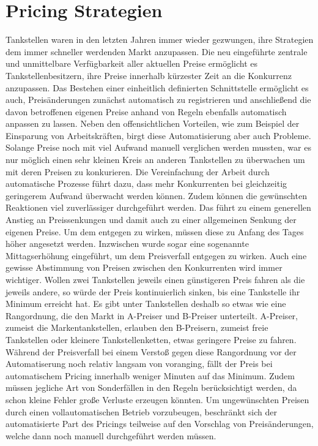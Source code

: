 \section{Pricing Strategien}
Tankstellen waren in den letzten Jahren immer wieder gezwungen, ihre Strategien dem immer schneller werdenden Markt anzupassen. Die neu eingeführte zentrale und unmittelbare Verfügbarkeit aller aktuellen Preise ermöglicht es Tankstellenbesitzern, ihre Preise innerhalb kürzester Zeit an die Konkurrenz anzupassen. Das Bestehen einer einheitlich definierten Schnittstelle ermöglicht es auch, Preisänderungen zunächst automatisch zu registrieren und anschließend die davon betroffenen eigenen Preise anhand von Regeln ebenfalls automatisch anpassen zu lassen. Neben den offensichtlichen Vorteilen, wie zum Beispiel der Einsparung von Arbeitskräften, birgt diese Automatisierung aber auch Probleme.\\
Solange Preise noch mit viel Aufwand manuell verglichen werden mussten, war es nur möglich einen sehr kleinen Kreis an anderen Tankstellen zu überwachen um mit deren Preisen zu konkurieren. Die Vereinfachung der Arbeit durch automatische Prozesse führt dazu, dass mehr Konkurrenten bei gleichzeitig geringerem Aufwand überwacht werden können. Zudem können die gewünschten Reaktionen viel zuverlässiger durchgeführt werden. Das führt zu einem generellen Anstieg an Preissenkungen und damit auch zu einer allgemeinen Senkung der eigenen Preise. Um dem entgegen zu wirken, müssen diese zu Anfang des Tages höher angesetzt werden. Inzwischen wurde sogar eine sogenannte Mittagserhöhung eingeführt, um dem Preisverfall entgegen zu wirken. Auch eine gewisse Abstimmung von Preisen zwischen den Konkurrenten wird immer wichtiger. Wollen zwei Tankstellen jeweils einen günstigeren Preis fahren als die jeweils andere, so würde der Preis kontinuierlich sinken, bis eine Tankstelle ihr Minimum erreicht hat. Es gibt unter Tankstellen deshalb so etwas wie eine Rangordnung, die den Markt in A-Preiser und B-Preiser unterteilt. A-Preiser, zumeist die Markentankstellen, erlauben den B-Preisern, zumeist freie Tankstellen oder kleinere Tankstellenketten, etwas geringere Preise zu fahren. Während der Preisverfall bei einem Verstoß gegen diese Rangordnung vor der Automatiserung noch relativ langsam von voranging, fällt der Preis bei automatischem Pricing innerhalb weniger Minuten auf das Minimum. Zudem müssen jegliche Art von Sonderfällen in den Regeln berücksichtigt werden, da schon kleine Fehler große Verluste erzeugen könnten. Um ungewünschten Preisen durch einen vollautomatischen Betrieb vorzubeugen, beschränkt sich der automatisierte Part des Pricings teilweise auf den Vorschlag von Preisänderungen, welche dann noch manuell durchgeführt werden müssen.\\


